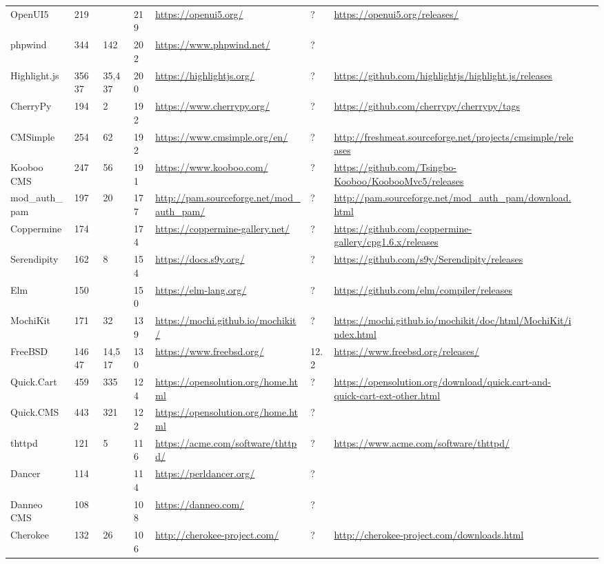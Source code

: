\begin{table}[!htp]
\begin{tabular}{|l|l|l|l|l|l|l|l|l|}
				OpenUI5 &219 & &219 &\ul{https://openui5.org/} &? &\ul{https://openui5.org/releases/} & \\
				phpwind &344 &142 &202 &\ul{https://www.phpwind.net/} &? & & \\
				Highlight.js &35637 &35,437 &200 &\ul{https://highlightjs.org/} &? &\ul{https://github.com/highlightjs/highlight.js/releases} & \\
				CherryPy &194 &2 &192 &\ul{https://www.cherrypy.org/} &? &\ul{https://github.com/cherrypy/cherrypy/tags} & \\
				CMSimple &254 &62 &192 &\ul{https://www.cmsimple.org/en/} &? &\ul{http://freshmeat.sourceforge.net/projects/cmsimple/releases} & \\
				Kooboo CMS &247 &56 &191 &\ul{https://www.kooboo.com/} &? &\ul{https://github.com/Tsingbo-Kooboo/KoobooMvc5/releases} & \\
				mod\_auth\_pam &197 &20 &177 &\ul{http://pam.sourceforge.net/mod\_auth\_pam/} &? &\ul{http://pam.sourceforge.net/mod\_auth\_pam/download.html} & \\
				Coppermine &174 & &174 &\ul{https://coppermine-gallery.net/} &? &\ul{https://github.com/coppermine-gallery/cpg1.6.x/releases} & \\
				Serendipity &162 &8 &154 &\ul{https://docs.s9y.org/} &? &\ul{https://github.com/s9y/Serendipity/releases} & \\
				Elm &150 & &150 &\ul{https://elm-lang.org/} &? &\ul{https://github.com/elm/compiler/releases} & \\
				MochiKit &171 &32 &139 &\ul{https://mochi.github.io/mochikit/} &? &\ul{https://mochi.github.io/mochikit/doc/html/MochiKit/index.html} & \\
				FreeBSD &14647 &14,517 &130 &\ul{https://www.freebsd.org/} &12.2 &\ul{https://www.freebsd.org/releases/} & \\
				Quick.Cart &459 &335 &124 &\ul{https://opensolution.org/home.html} &? &\ul{https://opensolution.org/download/quick.cart-and-quick-cart-ext-other.html} & \\
				Quick.CMS &443 &321 &122 &\ul{https://opensolution.org/home.html} &? & & \\
				thttpd &121 &5 &116 &\ul{https://acme.com/software/thttpd/} &? &\ul{https://www.acme.com/software/thttpd/} & \\
				Dancer &114 & &114 &\ul{https://perldancer.org/} &? & & \\
				Danneo CMS &108 & &108 &\ul{https://danneo.com/} &? & & \\
				Cherokee &132 &26 &106 &\ul{http://cherokee-project.com/} &? &\ul{http://cherokee-project.com/downloads.html} & \\

\end{tabular}
\end{table}
